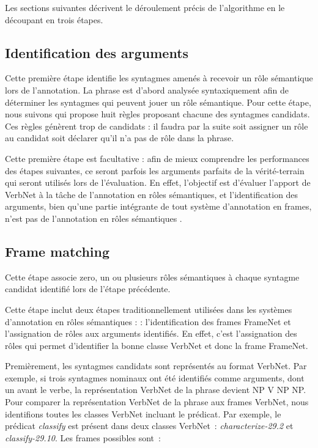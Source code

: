 Les sections suivantes décrivent le déroulement précis de l'algorithme en le
découpant en trois étapes.

\subsection{Identification des arguments}


Cette première étape identifie les syntagmes amenés à recevoir un rôle
sémantique lors de l'annotation. La phrase est d'abord analysée syntaxiquement
afin de déterminer les syntagmes qui peuvent jouer un rôle sémantique. Pour
cette étape, nous suivons \cite{lang2011unsupervised} qui propose huit règles
proposant chacune des syntagmes candidats. Ces règles génèrent trop de
candidats : il faudra par la suite soit assigner un rôle au candidat soit
déclarer qu'il n'a pas de rôle dans la phrase.


Cette première étape est facultative : afin de mieux comprendre les
performances des étapes suivantes, ce seront parfois les arguments parfaits de
la vérité-terrain qui seront utilisés lors de l'évaluation. En effet,
l'objectif est d'évaluer l'apport de VerbNet à la tâche de l'annotation en
rôles sémantiques, et l'identification des arguments, bien qu'une partie
intégrante de tout système d'annotation en frames, n'est pas de l'annotation en
rôles sémantiques \citep{das2010probabilistic}.

\subsection{Frame matching}

Cette étape associe zero, un ou plusieurs rôles sémantiques à chaque syntagme
candidat identifié lors de l'étape précédente.

Cette étape inclut deux étapes traditionnellement utilisées dans les systèmes
d'annotation en rôles sémantiques : \citep{gildea2002automatic,das2014frame} :
l'identification des frames FrameNet et l'assignation de rôles aux arguments
identifiés.  En effet, c'est l'assignation des rôles qui permet d'identifier la
bonne classe VerbNet et donc la frame FrameNet.

Premièrement, les syntagmes candidats sont représentés au format VerbNet. Par
exemple, si trois syntagmes nominaux ont été identifiés comme arguments, dont
un avant le verbe, la représentation VerbNet de la phrase devient NP V NP NP.
Pour comparer la représentation VerbNet de la phrase aux frames VerbNet, nous
identifions toutes les classes VerbNet incluant le prédicat. Par exemple, le
prédicat \textit{classify} est présent dans deux classes VerbNet~:
\textit{characterize-29.2} et \textit{classify-29.10}. Les frames possibles
sont~:

